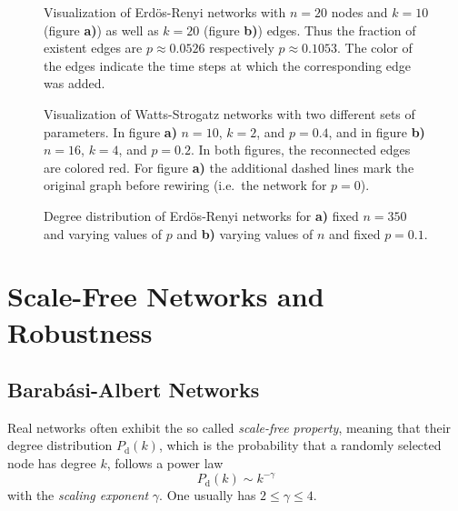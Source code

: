 \documentclass{scrartcl}
\begin{document}
\begin{figure}
    \centering
    \def\svgwidth{0.8\columnwidth}
    
    \caption{Visualization of Erdös-Renyi networks with $n=20$ nodes and $k = 10$ (figure \textbf{a)}) as well as $k = 20$ (figure \textbf{b)}) edges. Thus the fraction of existent edges are $p \approx 0.0526$ respectively $p \approx 0.1053$. The color of the edges indicate the time steps at which the corresponding edge was added.}
    \label{11_er}
\end{figure}

\begin{figure}
    \centering
    \def\svgwidth{0.8\columnwidth}
    
    \caption{Visualization of Watts-Strogatz networks with two different
        sets of parameters. In figure \textbf{a)} $n=10$, $k=2$, and
        $p=0.4$, and in figure \textbf{b)} $n=16$, $k=4$, and $p=0.2$. In
        both figures, the reconnected edges are colored red. For figure
        \textbf{a)} the additional dashed lines mark the original graph
    before rewiring (i.e.\ the network for $p=0$).}
    \label{13_ws}
\end{figure}

\begin{figure}
    \caption{Degree distribution of Erdös-Renyi networks for \textbf{a)} fixed $n=350$ and varying values of $p$ and \textbf{b)} varying values of $n$ and fixed $p=0.1$.}
		\label{fig:12_deg_dist}
\end{figure}

\clearpage
\section{Scale-Free Networks and Robustness}
\subsection{Barab\'asi-Albert Networks}
Real networks often exhibit the so called \emph{scale-free property},
meaning that their degree distribution $P_\mathrm{d}(k)$, which is the probability
that a randomly selected node has degree $k$, follows a power law
\begin{equation}
    P_\mathrm{d}(k) \sim k^{-\gamma}
\end{equation}
with the \emph{scaling exponent} $\gamma$. One usually has $2 \le \gamma \le 4$.
\end{document}
